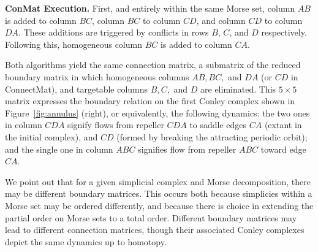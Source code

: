\documentclass[a4paper,english,cleveref]{article}
\theoremstyle{plain}
\newcounter{li}
\begin{document}
\textbf{{\sc ConMat} Execution.} First, and entirely within the same Morse set, column $AB$ is added to column $BC$, column $BC$ to column $CD$, and column $CD$ to column $DA$. These additions are triggered by conflicts in rows $B$, $C$, and $D$ respectively. Following this, homogeneous column $BC$ is added to column $CA$.

Both algorithms yield the same connection matrix, a submatrix of the reduced boundary matrix in which homogeneous columns $AB, BC,$ and $DA$ (or $CD$ in {\sc ConnectMat}), and targetable columns $B, C,$ and $D$ are eliminated. This $5 \times 5$ matrix expresses the boundary relation on the first Conley complex shown in Figure~\ref{fig:annulus} (right), or equivalently, the following dynamics: the two ones in column $CDA$ signify flows from repeller $CDA$ to saddle edges $CA$ (extant in the initial complex), and $CD$ (formed by breaking the attracting periodic orbit); and the single one in column $ABC$ signifies flow from repeller $ABC$ toward edge $CA$.

We point out that for a given simplicial complex and Morse decomposition, there may be different boundary matrices. This occurs both because simplicies within a Morse set may be ordered differently, and because there is choice in extending the partial order on Morse sets to a total order. Different boundary matrices may lead to different connection matrices, though their associated Conley complexes depict the same dynamics up to homotopy.
\end{document}
